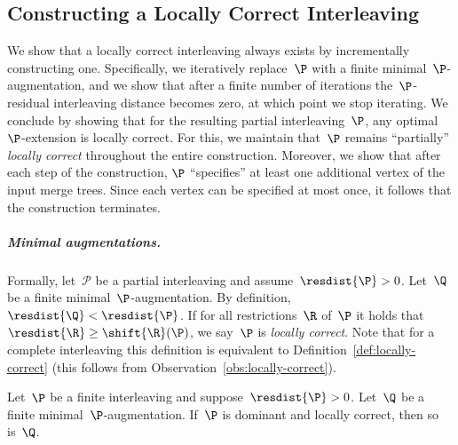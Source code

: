 \subsection{Constructing a Locally Correct Interleaving}\label{sec:locally-correct-partial-merge-tree-matchings}
We show that a locally correct interleaving always exists by incrementally constructing one.
Specifically, we iteratively replace~$\P$ with a finite minimal~$\P$-augmentation, and we show that after a finite number of iterations the~$\P$-residual interleaving distance becomes zero, at which point we stop iterating.
We conclude by showing that for the resulting partial interleaving~$\P$, any optimal~$\P$-extension is locally correct.
For this, we maintain that~$\P$ remains ``partially'' \emph{locally correct} throughout the entire construction.
Moreover, we show that after each step of the construction, $\P$ ``specifies'' at least one additional vertex of the input merge trees.
Since each vertex can be specified at most once, it follows that the construction terminates.
%
\subparagraph{Minimal augmentations.}
Formally, let~$\mathcal{P}$ be a partial interleaving and assume~$\resdist{\P} > 0$.
Let~$\Q$ be a finite minimal~$\P$-augmentation.
By definition,~$\resdist{\Q} < \resdist{\P}$.
If for all restrictions~$\R$ of~$\P$ it holds that~$\resdist{\R} \ge \shift{\R}(\P)$, we say~$\P$ is \emph{locally correct}.
Note that for a complete interleaving this definition is equivalent to Definition~\ref{def:locally-correct} (this follows from Observation~\ref{obs:locally-correct}).
\begin{lemma}\label{lem:dominant-locally-correct}
Let~$\P$ be a finite interleaving and suppose~$\resdist{\P} > 0$.
Let~$\Q$ be a finite minimal~$\P$-augmentation.
If~$\P$ is dominant and locally correct, then so is~$\Q$.
\end{lemma}

